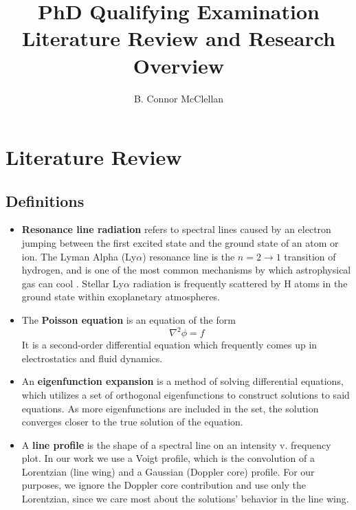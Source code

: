 \documentclass[onecolumn]{aastex63}
\begin{document}
\title{PhD Qualifying Examination \\ \small{\normalfont Literature Review and Research Overview}}
\author{B. Connor McClellan}
\keywords{}

\tableofcontents

\section{Literature Review}

\ifx
\subsection{Definitions}
\begin{itemize}
    \item \textbf{Resonance line radiation} refers to spectral lines caused by an electron jumping between the first excited state and the ground state of an atom or ion. The Lyman Alpha (Ly$\alpha$) resonance line is the $n=2\rightarrow1$ transition of hydrogen, and is one of the most common mechanisms by which astrophysical gas can cool \citep{neufeld1990}. Stellar Ly$\alpha$ radiation is frequently scattered by H atoms in the ground state within exoplanetary atmospheres.
    \item The \textbf{Poisson equation} is an equation of the form
    \begin{equation}
        \nabla^2 \phi = f
    \end{equation}
    It is a second-order differential equation which frequently comes up in electrostatics and fluid dynamics.
    \item An \textbf{eigenfunction expansion} is a method of solving differential equations, which utilizes a set of orthogonal eigenfunctions to construct solutions to said equations. As more eigenfunctions are included in the set, the solution converges closer to the true solution of the equation.
    \item A \textbf{line profile} is the shape of a spectral line on an intensity v. frequency plot. In our work we use a Voigt profile, which is the convolution of a Lorentzian (line wing) and a Gaussian (Doppler core) profile. For our purposes, we ignore the Doppler core contribution and use only the Lorentzian, since we care most about the solutions' behavior in the line wing.
\end{itemize}
\fi
\end{document}
